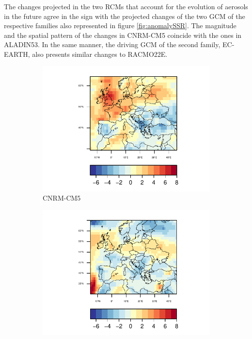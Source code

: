 The changes projected in the two RCMs that account for the evolution of aerosols in the future agree in the sign with the projected changes of the two GCM of the respective families also represented in figure \ref{fig:anomalySSR}. The magnitude and the spatial pattern of the changes in CNRM-CM5 coincide with the ones in ALADIN53. In the same manner, the driving GCM of the second family, EC-EARTH, also presents similar changes to RACMO22E. 

\begin{figure}[h]
  \centering\begin{subfigure}{0.4\textwidth}
    \includegraphics[width=1.4\textwidth]{figs/capitulo7/CNRM-CM5_ANOMALIAS_JJA_CLT_2050-2021.pdf}
    \caption{CNRM-CM5}
  \end{subfigure}
  \centering\begin{subfigure}{0.4\textwidth}
    \includegraphics[width=1.4\textwidth]{figs/capitulo7/EC-EARTH_ANOMALIAS_JJA_CLT_2050-2021.pdf}\hfill

\end{subfigure}
\end{figure}

